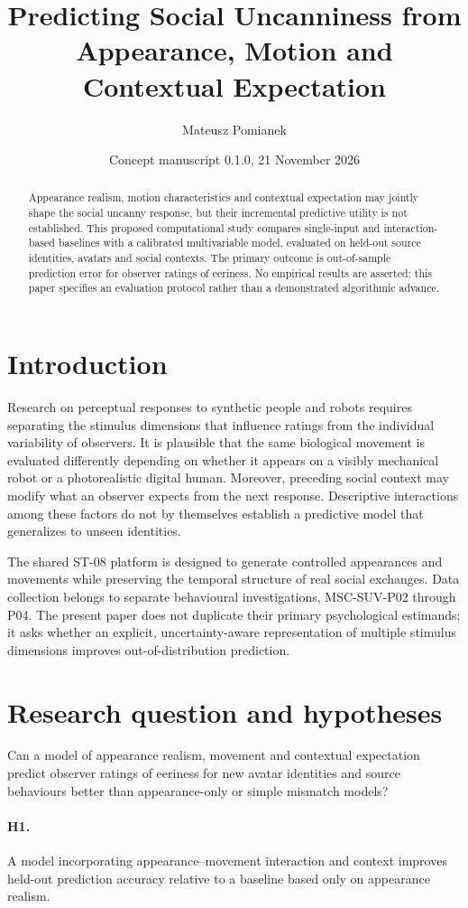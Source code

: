 \documentclass[11pt,a4paper]{article}
\title{Predicting Social Uncanniness from Appearance, Motion and Contextual Expectation}
\author{Mateusz Pomianek}
\date{Concept manuscript 0.1.0, 21 November 2026}
\begin{document}
\maketitle
\begin{abstract}
Appearance realism, motion characteristics and contextual expectation may jointly shape the social uncanny response, but their incremental predictive utility is not established. This proposed computational study compares single-input and interaction-based baselines with a calibrated multivariable model, evaluated on held-out source identities, avatars and social contexts. The primary outcome is out-of-sample prediction error for observer ratings of eeriness. No empirical results are asserted; this paper specifies an evaluation protocol rather than a demonstrated algorithmic advance.
\end{abstract}
\section{Introduction}
Research on perceptual responses to synthetic people and robots requires separating the stimulus dimensions that influence ratings from the individual variability of observers. It is plausible that the same biological movement is evaluated differently depending on whether it appears on a visibly mechanical robot or a photorealistic digital human. Moreover, preceding social context may modify what an observer expects from the next response. Descriptive interactions among these factors do not by themselves establish a predictive model that generalizes to unseen identities.

The shared ST-08 platform is designed to generate controlled appearances and movements while preserving the temporal structure of real social exchanges. Data collection belongs to separate behavioural investigations, MSC-SUV-P02 through P04. The present paper does not duplicate their primary psychological estimands; it asks whether an explicit, uncertainty-aware representation of multiple stimulus dimensions improves out-of-distribution prediction.
\section{Research question and hypotheses}
Can a model of appearance realism, movement and contextual expectation predict observer ratings of eeriness for new avatar identities and source behaviours better than appearance-only or simple mismatch models?
\paragraph{H1.} A model incorporating appearance--movement interaction and context improves held-out prediction accuracy relative to a baseline based only on appearance realism.
\end{document}
